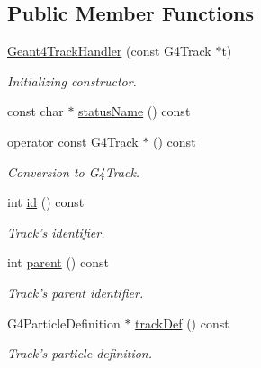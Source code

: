 \subsection*{Public Member Functions}
\begin{DoxyCompactItemize}
\item 
\hyperlink{class_d_d4hep_1_1_simulation_1_1_geant4_track_handler_a265dee4b9cf7103db1a6ea66941d300a}{Geant4TrackHandler} (const G4Track $\ast$t)
\begin{DoxyCompactList}\small\item\em Initializing constructor. \item\end{DoxyCompactList}\item 
const char $\ast$ \hyperlink{class_d_d4hep_1_1_simulation_1_1_geant4_track_handler_ad3d5910f752a3d4c0c97e1ef9fd3f4d2}{statusName} () const 
\item 
\hyperlink{class_d_d4hep_1_1_simulation_1_1_geant4_track_handler_a4f2fd4751ba0b7ee7d8339b1b0c7ec04}{operator const G4Track $\ast$} () const 
\begin{DoxyCompactList}\small\item\em Conversion to G4Track. \item\end{DoxyCompactList}\item 
int \hyperlink{class_d_d4hep_1_1_simulation_1_1_geant4_track_handler_a752a1a03018a5876076a6dc0872871ee}{id} () const 
\begin{DoxyCompactList}\small\item\em Track's identifier. \item\end{DoxyCompactList}\item 
int \hyperlink{class_d_d4hep_1_1_simulation_1_1_geant4_track_handler_ad41774cc4b314a21030145ed342ff234}{parent} () const 
\begin{DoxyCompactList}\small\item\em Track's parent identifier. \item\end{DoxyCompactList}\item 
G4ParticleDefinition $\ast$ \hyperlink{class_d_d4hep_1_1_simulation_1_1_geant4_track_handler_a3b1eb4da3634e8d0e912837732c00bdd}{trackDef} () const 
\begin{DoxyCompactList}\small\item\em Track's particle definition. \item\end{DoxyCompactList}\item 

\end{DoxyCompactItemize}
